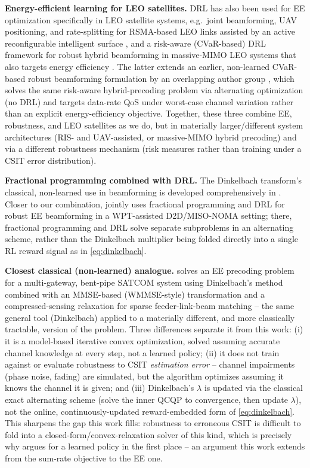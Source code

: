 \documentclass[11pt]{article}
\begin{document}
\textbf{Energy-efficient learning for LEO satellites.} DRL has also been
used for EE optimization specifically in LEO satellite systems, e.g.\ joint
beamforming, UAV positioning, and rate-splitting for RSMA-based LEO links
assisted by an active reconfigurable intelligent surface
\cite{YeganehBehroozi2025}, and a risk-aware (CVaR-based) DRL framework for
robust hybrid beamforming in massive-MIMO LEO systems that also targets
energy efficiency \cite{RiskAwareLEO2024}. The latter extends an earlier,
non-learned CVaR-based robust beamforming formulation by an overlapping
author group \cite{AlsenwiCVaR2023}, which solves the same risk-aware
hybrid-precoding problem via alternating optimization (no DRL) and targets
data-rate QoS under worst-case channel variation rather than an explicit
energy-efficiency objective. Together, these three combine EE, robustness,
and LEO satellites as we do, but in materially larger/different system
architectures (RIS- and UAV-assisted, or massive-MIMO hybrid precoding) and
via a different robustness mechanism (risk measures rather than training
under a CSIT error distribution).

\textbf{Fractional programming combined with DRL.} The Dinkelbach
transform's classical, non-learned use in beamforming is developed
comprehensively in \cite{ShenYu2018}. Closer to our combination,
\cite{JiaoFangDing2022} jointly uses fractional programming and DRL for
robust EE beamforming in a WPT-assisted D2D/MISO-NOMA setting; there,
fractional programming and DRL solve separate subproblems in an alternating
scheme, rather than the Dinkelbach multiplier being folded directly into a
single RL reward signal as in \eqref{eq:dinkelbach}.

\textbf{Closest classical (non-learned) analogue.} \cite{HaEtAl2024}
solves an EE precoding problem for a multi-gateway, bent-pipe SATCOM system
using Dinkelbach's method combined with an MMSE-based (WMMSE-style)
transformation and a compressed-sensing relaxation for sparse
feeder-link-beam matching -- the same general tool (Dinkelbach) applied to
a materially different, and more classically tractable, version of the
problem. Three differences separate it from this work: (i) it is a
model-based iterative convex optimization, solved assuming accurate channel
knowledge at every step, not a learned policy; (ii) it does not train
against or evaluate robustness to CSIT \emph{estimation error} -- channel
impairments (phase noise, fading) are simulated, but the algorithm optimizes
assuming it knows the channel it is given; and (iii) Dinkelbach's $\lambda$
is updated via the classical exact alternating scheme (solve the inner QCQP
to convergence, then update $\lambda$), not the online, continuously-updated
reward-embedded form of \eqref{eq:dinkelbach}. This sharpens the gap this
work fills: robustness to erroneous CSIT is difficult to fold into a
closed-form/convex-relaxation solver of this kind, which is precisely why
\cite{Schroder2025} argues for a learned policy in the first place -- an
argument this work extends from the sum-rate objective to the EE one.
\end{document}
